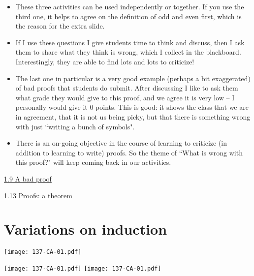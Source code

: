 \documentclass[11pt]{article}
\newcommand{\n}{\newpage}
\newcommand{\nl}{\hfill \vspace{-1.1\baselineskip}} %
\newcommand{\vnine}{\hspace{8mm}\href{https://www.youtube.com/watch?v=H7NkSHt5Bao&list=PLlwePzQY_wW-CPzhk-af-MXj9knthD1gx&index=9}{1.9 A bad proof}}
\newcommand{\veleven}{\hspace{8mm}\href{https://www.youtube.com/watch?v=9rYcAygjOas&list=PLlwePzQY_wW-CPzhk-af-MXj9knthD1gx&index=11}{1.11 Proofs: an example}}
\newcommand{\vthirteen}{\hspace{8mm}\href{https://www.youtube.com/watch?v=x0d3gO1e868&list=PLlwePzQY_wW-CPzhk-af-MXj9knthD1gx&index=13}{1.13 Proofs: a theorem}}
\begin{document}
\begin{comments}
\nl
\begin{itemize}
	\item  These three activities can be used independently or together.   If you use the third one, it helps to agree on the definition of odd and even first, which is the reason for the extra slide.
	\item If I use these questions I give students time to think and discuss, then I ask them to share what they think is wrong, which I collect in the blackboard.  Interestingly, they are able to find lots and lots to criticize!  
	\item The last one in particular is a very good example (perhaps a bit exaggerated) of bad proofs that students do submit.  After discussing I like to ask them what grade they would give to this proof, and we agree it is very low -- I personally would give it 0 points.  This is good: it shows the class that we are in agreement, that it is not us being picky, but that there is something wrong with just ``writing a bunch of symbols".
	\item There is an on-going objective in the course of learning to criticize (in addition to learning to write) proofs.  So the theme of ``What is wrong with this proof?" will keep coming back in our activities.
\end{itemize}
\end{comments}

\begin{videos}
\vnine

\vthirteen
\end{videos}


\n
\newpage
\section{Variations on induction} 

\begin{center}
{ \texttt{[image: 137-CA-01.pdf]}}

{ \texttt{[image: 137-CA-01.pdf]}}
\quad
{ \texttt{[image: 137-CA-01.pdf]}}
\end{center}
\end{document}

